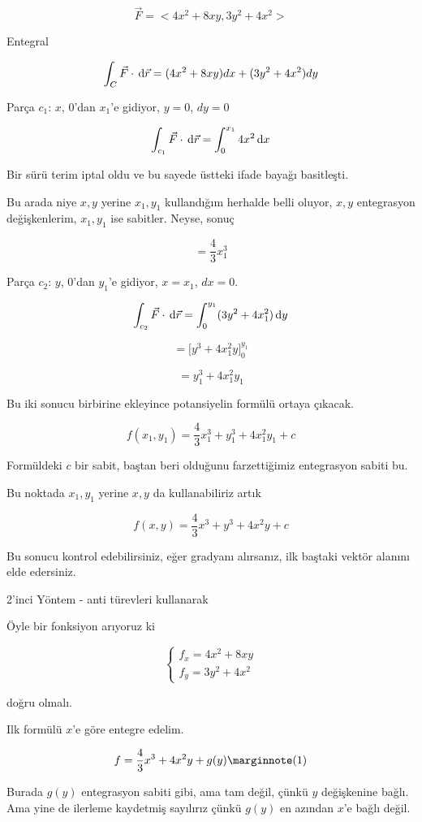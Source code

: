 \documentclass[12pt,fleqn]{article}\usepackage{../../common}
\begin{document}
$$ \vec{F} = < 4x^2 + 8xy, 3y^2 + 4x^2 >$$

Entegral

$$ \int_C \vec{F} \cdot \,\mathrm{d}\vec{r} = 
(4x^2 + 8xy) dx + (3y^2 + 4x^2) dy
$$

Parça $c_1$: $x$, 0'dan $x_1$'e gidiyor, $y=0$, $dy = 0$

$$
\int_{c_1} \vec{F} \cdot \,\mathrm{d}\vec{r} =  \int_0^{x_1} 4x^2 \,\mathrm{d} x 
$$

Bir sürü terim iptal oldu ve bu sayede üstteki ifade bayağı basitleşti. 

Bu arada niye $x,y$ yerine $x_1,y_1$ kullandığım herhalde belli oluyor,
$x,y$ entegrasyon değişkenlerim, $x_1,y_1$ ise sabitler. Neyse, sonuç

$$ = \frac{4}{3} x_1^3$$

Parça $c_2$: $y$, 0'dan $y_1$'e gidiyor, $x=x_1$, $dx = 0$. 

$$
\int_{c_2} \vec{F} \cdot \,\mathrm{d}\vec{r} = 
\int_0^{y_1} (3y^2 + 4x_1^2) \,\mathrm{d} y
$$

$$ = \bigg[ y^3 + 4x_1^2y \bigg]_0^{y_1} $$

$$ = y_1^3 + 4x_1^2y_1 $$

Bu iki sonucu birbirine ekleyince potansiyelin formülü ortaya çıkacak.

$$ f(x_1,y_1) = \frac{4}{3} x_1^3 + y_1^3 + 4x_1^2y_1 + c$$

Formüldeki $c$ bir sabit, baştan beri olduğunu farzettiğimiz entegrasyon
sabiti bu. 

Bu noktada $x_1,y_1$ yerine $x,y$ da kullanabiliriz artık

$$ f(x,y) = \frac{4}{3} x^3 + y^3 + 4x^2y + c$$

Bu sonucu kontrol edebilirsiniz, eğer gradyanı alırsanız, ilk baştaki vektör
alanını elde edersiniz.

2'inci Yöntem - anti türevleri kullanarak

Öyle bir fonksiyon arıyoruz ki 

$$ 
\left\{ \begin{array}{l}
f_x = 4x^2 + 8xy \\
f_y = 3y^2 + 4x^2
\end{array} \right.
$$

doğru olmalı. 

Ilk formülü $x$'e göre entegre edelim. 

$$ f = \frac{4}{3}x^3 + 4x^2y + g(y)
\mlabel{1}$$

Burada $g(y)$ entegrasyon sabiti gibi, ama tam değil, çünkü $y$ değişkenine
bağlı. Ama yine de ilerleme kaydetmiş sayılırız çünkü $g(y)$ en azından $x$'e
bağlı değil.
\end{document}
